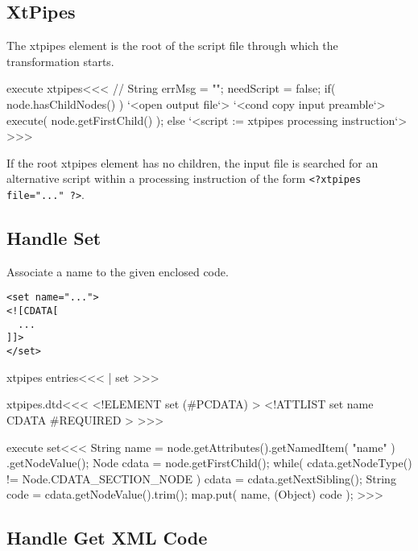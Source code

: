 \documentclass{article}
\begin{document}
{%
\subsection{XtPipes}

The xtpipes element is the root of the script file through which
the transformation starts.

\<execute xtpipes\><<<
// String errMsg = "";
needScript = false;
if( node.hasChildNodes() ){
  `<open output file`>
  `<cond copy input preamble`>
   execute( node.getFirstChild() );
} else {
   `<script := xtpipes processing instruction`>
}
>>>






If the root xtpipes element has no children, the input file is
searched for an alternative script within a processing instruction of
the form \verb+<?xtpipes file="..." ?>+.





\subsection{Handle Set}

Associate a name to the given enclosed  code.

\begin{verbatim}
<set name="...">
<![CDATA[
  ...
]]>
</set>
\end{verbatim}

\<xtpipes entries\><<<
| set
>>>

\<xtpipes.dtd\><<<
<!ELEMENT set (#PCDATA) >
<!ATTLIST set
          name CDATA #REQUIRED >
>>>





\<execute set\><<<
String name = node.getAttributes().getNamedItem( "name" )
                                  .getNodeValue();
Node cdata = node.getFirstChild();
while( cdata.getNodeType() != Node.CDATA_SECTION_NODE ){
   cdata = cdata.getNextSibling();
}
String code = cdata.getNodeValue().trim();
map.put( name, (Object) code );
>>>









\subsection{Handle Get XML Code}

}
\end{document}
